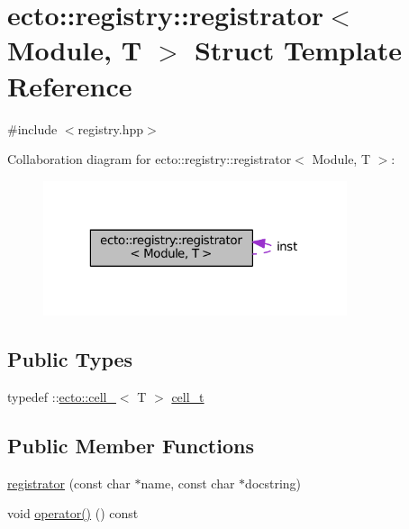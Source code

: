 \hypertarget{structecto_1_1registry_1_1registrator}{\section{ecto\-:\-:registry\-:\-:registrator$<$ Module, T $>$ Struct Template Reference}
\label{structecto_1_1registry_1_1registrator}
}


{\ttfamily \#include $<$registry.\-hpp$>$}



Collaboration diagram for ecto\-:\-:registry\-:\-:registrator$<$ Module, T $>$\-:\nopagebreak
\begin{figure}[H]
\begin{center}
\leavevmode
\includegraphics[width=253pt]{structecto_1_1registry_1_1registrator__coll__graph}
\end{center}
\end{figure}
\subsection*{Public Types}
\begin{DoxyCompactItemize}
\item 
typedef \-::\hyperlink{structecto_1_1cell__}{ecto\-::cell\-\_\-}$<$ T $>$ \hyperlink{structecto_1_1registry_1_1registrator_ae352ebfb18c87dc7fb3f649ecbe445fa}{cell\-\_\-t}
\end{DoxyCompactItemize}
\subsection*{Public Member Functions}
\begin{DoxyCompactItemize}
\item 
\hyperlink{structecto_1_1registry_1_1registrator_a3c8bafa2e65ef88c572c1779fb05fd12}{registrator} (const char $\ast$name, const char $\ast$docstring)
\item 
void \hyperlink{structecto_1_1registry_1_1registrator_a11572913b91238e8d6415bb89cc7ac1a}{operator()} () const 
\end{DoxyCompactItemize}
